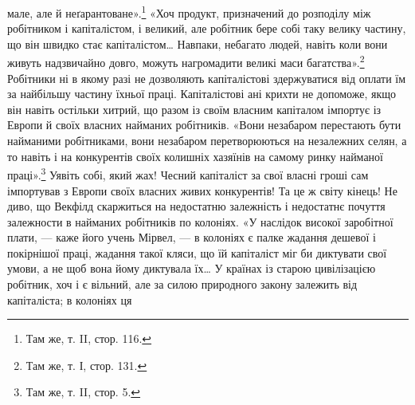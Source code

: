 \parcont{}  %
мале, але й неґарантоване».\footnote{
Там же, т. II, стор. 116.
} «Хоч продукт, призначений до розподілу між робітником і капіталістом,
і великий, але робітник бере собі таку велику частину, що він швидко стає капіталістом\dots{} Навпаки,
небагато людей, навіть коли вони живуть надзвичайно довго, можуть нагромадити великі маси
багатства».\footnote{
Там же, т. І, стор. 131.
} Робітники ні в якому разі не дозволяють капіталістові здержуватися від оплати їм за
найбільшу частину їхньої праці. Капіталістові ані крихти не допоможе, якщо він навіть
остільки хитрий, що разом із своїм власним капіталом імпортує із Европи й своїх власних найманих
робітників. «Вони незабаром перестають бути найманими робітниками, вони незабаром перетворюються на
незалежних селян, а то навіть і на конкурентів своїх колишніх хазяїнів на самому ринку найманої
праці».\footnote{
Там же, т. II, стор. 5.
} Уявіть собі, який жах! Чесний капіталіст за свої власні гроші сам імпортував з Европи
своїх власних живих конкурентів! Та це ж світу кінець! Не диво, що Векфілд скаржиться на недостатню
залежність і недостатнє почуття залежности в найманих робітників по колоніях. «У наслідок високої
заробітної плати, — каже його учень Мірвел, — в колоніях є палке жадання дешевої і покірнішої праці,
жадання такої кляси, що їй капіталіст
міг би диктувати свої умови, а не щоб вона йому диктувала їх\dots{} У країнах із старою цивілізацією
робітник, хоч і є вільний, але за силою природного закону залежить від капіталіста; в колоніях ця
